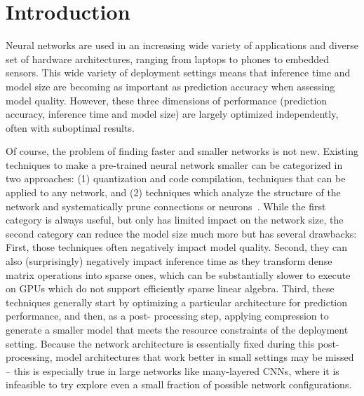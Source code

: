 
\section{Introduction}

Neural networks are used in an increasing wide variety of
applications and diverse set of hardware architectures, ranging from laptops to
phones to embedded sensors. This wide variety of deployment settings means
that inference time and model size are becoming as important as  prediction
accuracy when assessing model quality.  However, these three dimensions of
performance (prediction accuracy, inference time and model size) are largely
optimized independently, often with suboptimal results.

Of course, the problem of finding faster and smaller networks is not new.
Existing techniques to make a pre-trained neural network smaller can be
categorized in two approaches: (1) quantization \cite{Jouppi:2017:IPA:3079856.3080246} and code
compilation, techniques that can be applied  to
any network, and (2) techniques which analyze the structure of the network and
systematically prune connections or neurons~\cite{han2015deepcompression,Cun}. 
While the first category is always useful, but only
has limited impact on the network size, the second category can reduce the model
size much more but has several drawbacks:   First, those techniques often
negatively impact model quality.  Second, they can also (surprisingly) negatively
impact inference time as they transform dense matrix operations into sparse
ones, which can be substantially slower to execute on GPUs which do not support
efficiently sparse linear algebra\cite{han2015deepcompression}. 
Third, these techniques generally start by optimizing a
particular architecture for prediction performance, and then, as a post-
processing step, applying compression  to generate a smaller model that meets
the resource constraints of the deployment setting.  Because the network
architecture is essentially fixed during this post-processing,   model
architectures that work better in small settings may be missed -- this is
especially true in large networks like many-layered CNNs,  where it is
infeasible to try explore even a small fraction of possible network
configurations.


